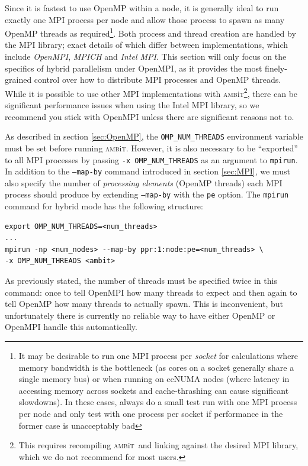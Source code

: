 \documentclass{report}
\newcommand{\ambit}{\textsc{amb}{\footnotesize i}\textsc{t}}
\begin{document}
Since it is fastest to use OpenMP within a node, it is generally ideal to run exactly one MPI process per
node and allow those process to spawn as many OpenMP threads as required\footnote{It may be desirable 
to run one MPI process per \emph{socket} for calculations where memory bandwidth is the bottleneck (as 
cores on a socket generally share a single memory bus) or when running on ccNUMA nodes (where latency in
accessing memory across sockets and cache-thrashing can cause significant slowdowns). In these cases,
always do a small test run with one MPI process per node and only test with one process per socket if
performance in the former case is unacceptably bad}. Both process and thread
creation are handled by the MPI library; exact details of which differ between implementations, which 
include \textit{OpenMPI}, \textit{MPICH} and \textit{Intel MPI}. This section will only focus on the
specifics of hybrid parallelism under OpenMPI, as it provides the most finely-grained control over how to
distribute MPI processes and OpenMP threads. While it is possible to use other MPI implementations with
\ambit\footnote{This requires recompiling \ambit\ and linking against the desired MPI library, which we
do not recommend for most users.}, there can be significant performance issues when using the Intel MPI
library, so we recommend you stick with OpenMPI unless there are significant reasons not to.

As described in section \ref{sec:OpenMP}, the \texttt{OMP\_NUM\_THREADS}
environment variable must be set before running \ambit. However, it is also necessary to be ``exported''
to all MPI processes by passing \texttt{-x OMP\_NUM\_THREADS} as an argument to \texttt{mpirun}. In 
addition to the \texttt{--map-by} command introduced in section
\ref{sec:MPI}, we must also specify the number of \textit{processing elements} (OpenMP threads) each MPI 
process should produce by extending \texttt{--map-by} with the \texttt{pe} option. The \texttt{mpirun}
command for hybrid mode has the following structure:

\begin{verbatim}
export OMP_NUM_THREADS=<num_threads>
...
mpirun -np <num_nodes> --map-by ppr:1:node:pe=<num_threads> \
-x OMP_NUM_THREADS <ambit>
\end{verbatim}

As previously stated, the number of threads must be specified twice in this command: once to tell 
OpenMPI how many threads to expect and then again to tell OpenMP how many threads to actually spawn. This
is inconvenient, but unfortunately there is currently no reliable way to have either OpenMP or OpenMPI 
handle this automatically.
\end{document}
